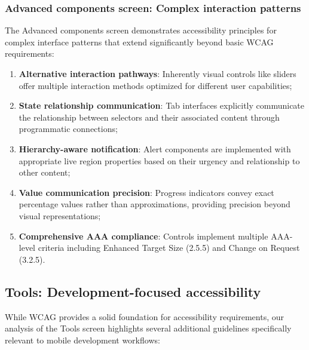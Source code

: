 \subsubsection{Advanced components screen: Complex interaction patterns}
\label{subsubsec:advanced-beyond-wcag}

The Advanced components screen demonstrates accessibility principles for complex interface patterns that extend significantly beyond basic WCAG requirements:

\begin{enumerate}
    \item \textbf{Alternative interaction pathways}: Inherently visual controls like sliders offer multiple interaction methods optimized for different user capabilities;
    
    \item \textbf{State relationship communication}: Tab interfaces explicitly communicate the relationship between selectors and their associated content through programmatic connections;
    
    \item \textbf{Hierarchy-aware notification}: Alert components are implemented with appropriate live region properties based on their urgency and relationship to other content;
    
    \item \textbf{Value communication precision}: Progress indicators convey exact percentage values rather than approximations, providing precision beyond visual representations;
    
    \item \textbf{Comprehensive AAA compliance}: Controls implement multiple AAA-level criteria including Enhanced Target Size (2.5.5) and Change on Request (3.2.5).
\end{enumerate}

\subsection{Tools: Development-focused accessibility}

While WCAG provides a solid foundation for accessibility requirements, our analysis of the Tools screen highlights several additional guidelines specifically relevant to mobile development workflows:


